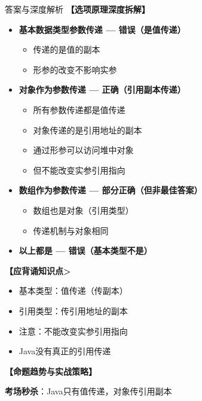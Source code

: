 \documentclass[12pt, a4paper]{ctexart}
\begin{document}
\begin{enumerate}[label=\textbf{\arabic*.}]
\begin{bluebox}{答案与深度解析}
		      \textbf{【选项原理深度拆解】}
		      \begin{itemize}[label={}, nosep]

		      \item \textbf{基本数据类型参数传递 — 错误（是值传递）}
		      \begin{itemize}[label={}, nosep]
			      \item 传递的是值的副本
			      \item 形参的改变不影响实参
		      \end{itemize}

		      \item \textbf{对象作为参数传递 — 正确（引用副本传递）}
		      \begin{itemize}[label={}, nosep]
			      \item 所有参数传递都是值传递
			      \item 对象传递的是引用地址的副本
			      \item 通过形参可以访问堆中对象
			      \item 但不能改变实参引用指向
		      \end{itemize}

		      \item \textbf{数组作为参数传递 — 部分正确（但非最佳答案）}
		      \begin{itemize}[label={}, nosep]
			      \item 数组也是对象（引用类型）
			      \item 传递机制与对象相同
		      \end{itemize}

		      \item \textbf{以上都是 — 错误（基本类型不是）}
		      \end{itemize}

		      \textbf{【应背诵知识点>}
		      \begin{itemize}[label={}, nosep]
			      \item 基本类型：值传递（传副本）
			      \item 引用类型：传引用地址的副本
			      \item 注意：不能改变实参引用指向
			      \item Java没有真正的引用传递
		      \end{itemize}

		      \textbf{【命题趋势与实战策略】}

		      \textbf{考场秒杀}：Java只有值传递，对象传引用副本
	      \end{bluebox}

\end{enumerate}
\end{document}
